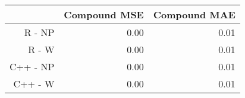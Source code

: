 \begin{table}[ht]
\centering
\begin{tabular}{rrr}
  \hline
 & Compound MSE & Compound MAE \\ 
  \hline
R - NP & 0.00 & 0.01 \\ 
  R - W & 0.00 & 0.01 \\ 
  C++ - NP & 0.00 & 0.01 \\ 
  C++ - W & 0.00 & 0.01 \\ 
   \hline
\end{tabular}
\end{table}
